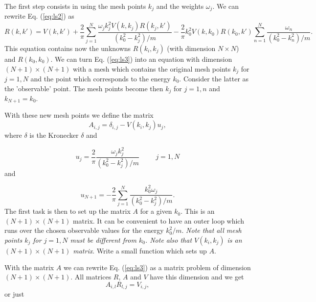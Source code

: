 \documentclass[%
oneside,                 %
final,                   %
10pt]{article}
\begin{document}
The first step consists in using the mesh points $k_j$ and the weights $\omega_j$. We can rewrite Eq. (\ref{eq:ls2}) as
\begin{equation} \label{eq:ls3}
R(k,k') = V(k,k') +\frac{2}{\pi}\sum_{j=1}^N\frac{\omega_jk_j^2V(k,k_j)R(k_j,k')}{(k_0^2-k_j^2)/m}-\frac{2}{\pi}k_0^2V(k,k_0)R(k_0,k')\sum_{n=1}^N\frac{\omega_n}{(k_0^2-k_n^2)/m}.                           
\end{equation}
This equation contains now the unknowns $R(k_i,k_j)$
(with dimension $N\times N$) and $R(k_0,k_0)$.
We can turn Eq. (\ref{eq:ls3}) into an equation with dimension $(N+1)\times (N+1)$ with  a mesh which contains the original mesh points $k_j$ for $j=1,N$ and the point which corresponds to the energy $k_0$. Consider the latter as the 'observable' point. The mesh points become then $k_j$ for $j=1,n$ and $k_{N+1}=k_0$.

With these new mesh points we define the matrix
\begin{equation}        \label{eq:aeq}
A_{i,j}=\delta_{i,j}-V(k_i,k_j)u_j,
\end{equation}
where $\delta$ is the Kronecker $\delta$
and

\begin{equation}
     u_j=\frac{2}{\pi}
         \frac{\omega_jk_j^2}{(k_0^2-k_j^2)/m}\hspace{1cm}
         j=1,N
\end{equation}
and

\begin{equation}
     u_{N+1}=-\frac{2}{\pi}
          \sum_{j=1}^N\frac{k_0^2\omega_j}{(k_0^2-k_j^2)/m}.
\end{equation}
The first task is then to 
set up the matrix $A$ for a given $k_0$. This is an
$(N+1)\times (N+1)$ matrix. It can be convenient
to have an outer loop which runs over the chosen
observable values for the energy $k_0^2/m$.
{\em Note that all mesh points $k_j$ for $j=1,N$ must be
different from $k_0$. Note also that
$V(k_i,k_j)$ is an
$(N+1)\times (N+1)$ matrix}. Write a small function
which sets up $A$.

With the matrix $A$ we can rewrite Eq. (\ref{eq:ls3})    as a matrix problem of dimension $(N+1)\times (N+1)$.   All matrices $R$, $A$ and $V$ have this dimension   and we get
\begin{equation}
A_{i,l}R_{l,j}=V_{i,j},
\end{equation}
or just
\end{document}
